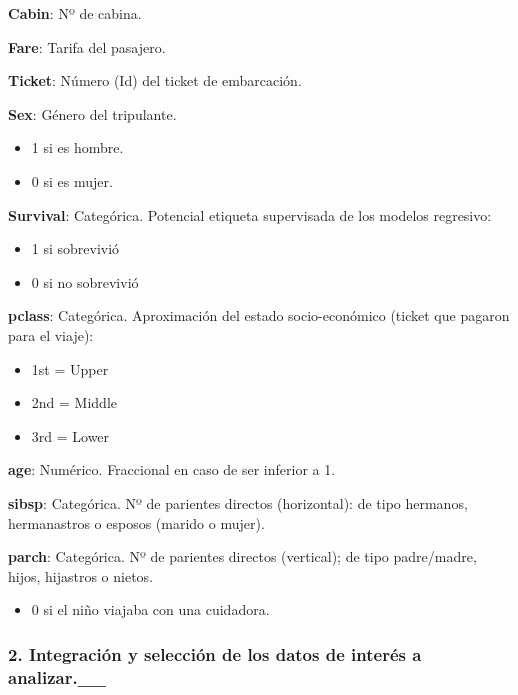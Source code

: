 \documentclass[]{article}
\providecommand{\tightlist}{%
  \setlength{\itemsep}{0pt}\setlength{\parskip}{0pt}}
\begin{document}
\textbf{Cabin}: Nº de cabina.

\textbf{Fare}: Tarifa del pasajero.

\textbf{Ticket}: Número (Id) del ticket de embarcación.

\textbf{Sex}: Género del tripulante.

\begin{itemize}
\tightlist
\item
  1 si es hombre.
\item
  0 si es mujer.
\end{itemize}

\textbf{Survival}: Categórica. Potencial etiqueta supervisada de los
modelos regresivo:

\begin{itemize}
\tightlist
\item
  1 si sobrevivió
\item
  0 si no sobrevivió
\end{itemize}

\textbf{pclass}: Categórica. Aproximación del estado socio-económico
(ticket que pagaron para el viaje):

\begin{itemize}
\tightlist
\item
  1st = Upper
\item
  2nd = Middle
\item
  3rd = Lower
\end{itemize}

\textbf{age}: Numérico. Fraccional en caso de ser inferior a 1.

\textbf{sibsp}: Categórica. Nº de parientes directos (horizontal): de
tipo hermanos, hermanastros o esposos (marido o mujer).

\textbf{parch}: Categórica. Nº de parientes directos (vertical); de tipo
padre/madre, hijos, hijastros o nietos.

\begin{itemize}
\tightlist
\item
  0 si el niño viajaba con una cuidadora.
\end{itemize}

\hypertarget{integraciuxf3n-y-selecciuxf3n-de-los-datos-de-interuxe9s-a-analizar.__}{%
\subsubsection{2. Integración y selección de los datos de interés a
analizar.\_\_}\label{integraciuxf3n-y-selecciuxf3n-de-los-datos-de-interuxe9s-a-analizar.__}}
\end{document}
